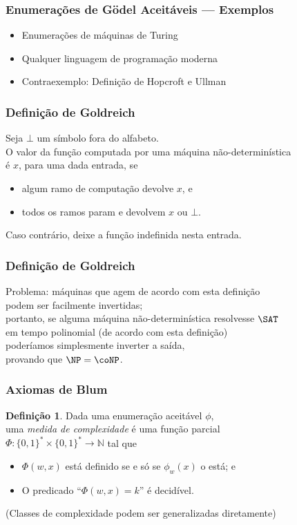 \documentclass[utf8,notheorems]{beamer}
\theoremstyle{definition}
\newtheorem*{definition}{Definição}
\begin{document}
\begin{frame}
    \frametitle{Enumerações de Gödel Aceitáveis --- Exemplos}
    \begin{itemize}
        \item Enumerações de máquinas de Turing
        \item Qualquer linguagem de programação moderna
        \item Contraexemplo: Definição de Hopcroft e Ullman
    \end{itemize}
\end{frame}

\begin{frame}
    \frametitle{Definição de Goldreich}
    Seja $\bot$ um símbolo fora do alfabeto. \\
    O valor da função computada por uma máquina não-determinística \\
    é $x$, para uma dada entrada, se
    \begin{itemize}
        \item algum ramo de computação devolve $x$, e
        \item todos os ramos param e devolvem $x$ ou $\bot$.
    \end{itemize}
    Caso contrário, deixe a função indefinida nesta entrada.
    \cite[p.~313]{HopcroftUllman1979}
\end{frame}

\begin{frame}
    \frametitle{Definição de Goldreich}
    Problema: máquinas que agem de acordo com esta definição \\
    podem ser facilmente invertidas;\\
    portanto, se alguma máquina não-determinística resolvesse $\SAT$ \\
    em tempo polinomial (de acordo com esta definição) \\
    poderíamos simplesmente inverter a saída, \\
    provando que $\NP = \coNP$.
\end{frame}

\begin{frame}
    \frametitle{Axiomas de Blum}
    \begin{definition}
        Dada uma enumeração aceitável $\phi$, \\
        uma \emph{medida de complexidade} é uma função parcial \\
        \alert<2>{$\Phi: \{0, 1\}^* \times \{0, 1\}^* \to \mathbb N$} tal que
        \begin{itemize}
            \item $\Phi(w, x)$ está definido se e só se $\phi_w(x)$ o está; e \\
            \item O predicado ``$\Phi(w, x) = k$'' é decidível.
        \end{itemize}
    \end{definition}
    \cite[p.~324]{Blum1967}

    (Classes de complexidade podem ser generalizadas diretamente)
\end{frame}
\end{document}
